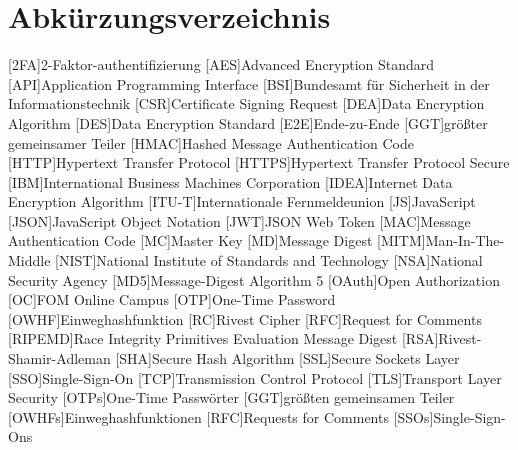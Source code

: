 \section*{Abkürzungsverzeichnis}


\begin{acronym}
	[HTTPS]\itemsep0pt %
    [2FA]{2-Faktor-\gls{authentifizierung}}
    [AES]{Advanced Encryption Standard}
    [API]{Application Programming Interface}
    [BSI]{Bundesamt für Sicherheit in der Informationstechnik}
    [CSR]{Certificate Signing Request}
    [DEA]{Data Encryption Algorithm}
    [DES]{Data Encryption Standard}
    [E2E]{Ende-zu-Ende}
    [GGT]{größter gemeinsamer Teiler}
    [HMAC]{Hashed Message Authentication Code}
    [HTTP]{Hypertext Transfer Protocol}
    [\acs{HTTP}S]{Hypertext Transfer Protocol Secure}
    [IBM]{International Business Machines Corporation}
    [IDEA]{Internet Data Encryption Algorithm}
    [ITU-T]{Internationale Fernmeldeunion}
    [JS]{JavaScript}
    [JSON]{JavaScript Object Notation}
    [JWT]{JSON Web Token}
    [MAC]{Message Authentication Code}
    [MC]{Master Key}
    [MD]{Message Digest}
    [MITM]{Man-In-The-Middle}
    [NIST]{National Institute of Standards and Technology}
    [NSA]{National Security Agency}
    [MD5]{Message-Digest Algorithm 5}
    [OAuth]{Open Authorization}
    [OC]{FOM Online Campus} 
    [OTP]{One-Time Password}
    [OWHF]{Einweghashfunktion}
    [RC]{Rivest Cipher}
    [RFC]{Request for Comments}
    [RIPEMD]{Race Integrity Primitives Evaluation Message Digest}
    [RSA]{Rivest-Shamir-Adleman}
    [SHA]{Secure Hash Algorithm}
    [SSL]{Secure Sockets Layer}
    [SSO]{Single-Sign-On}
    [TCP]{Transmission Control Protocol}
    [TLS]{Transport Layer Security}
    [OTPs]{One-Time Passwörter}
    [GGT]{größten gemeinsamen Teiler}
    [OWHFs]{Einweghashfunktionen}
    [RFC]{Requests for Comments}
    [SSOs]{Single-Sign-Ons}
\end{acronym}